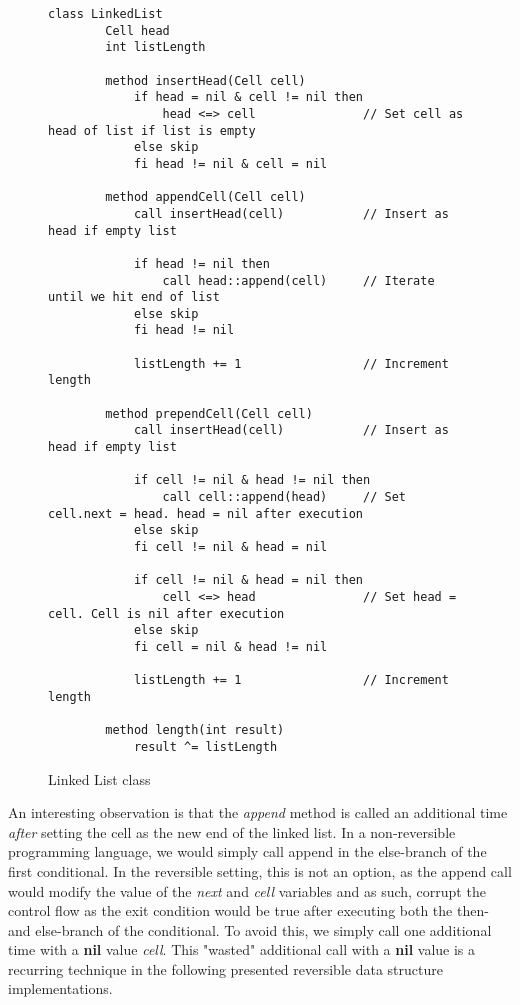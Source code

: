 \begin{figure}[ht!]
    \centering
    \begin{lstlisting}[style = basic, language = roopl]                
    class LinkedList
        Cell head
        int listLength
    
        method insertHead(Cell cell)
            if head = nil & cell != nil then
                head <=> cell               // Set cell as head of list if list is empty
            else skip
            fi head != nil & cell = nil
    
        method appendCell(Cell cell)
            call insertHead(cell)           // Insert as head if empty list
    
            if head != nil then
                call head::append(cell)     // Iterate until we hit end of list
            else skip
            fi head != nil
    
            listLength += 1                 // Increment length
    
        method prependCell(Cell cell)
            call insertHead(cell)           // Insert as head if empty list
    
            if cell != nil & head != nil then
                call cell::append(head)     // Set cell.next = head. head = nil after execution
            else skip
            fi cell != nil & head = nil
    
            if cell != nil & head = nil then
                cell <=> head               // Set head = cell. Cell is nil after execution
            else skip
            fi cell = nil & head != nil
    
            listLength += 1                 // Increment length
    
        method length(int result)
            result ^= listLength  
    \end{lstlisting}
    \caption{Linked List class}
    \label{fig:linked-list-class}
\end{figure}

An interesting observation is that the \textit{append} method is called an additional time \textit{after} setting the cell as the new end of the linked list. In a non-reversible programming language, we would simply call append in the else-branch of the first conditional. In the reversible setting, this is not an option, as the append call would modify the value of the \textit{next} and \textit{cell} variables and as such, corrupt the control flow as the exit condition would be true after executing both the then- and else-branch of the conditional. To avoid this, we simply call one additional time with a \textbf{nil} value \textit{cell}.
This "wasted" additional call with a \textbf{nil} value is a recurring technique in the following presented reversible data structure implementations. 

